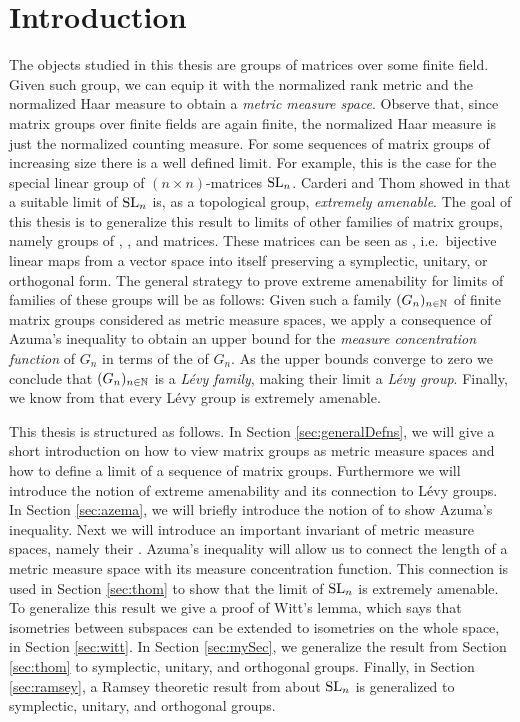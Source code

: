 
\section{Introduction}
The objects studied in this thesis are groups of matrices over some finite field.
Given such group, we can equip it with the normalized rank metric and the normalized Haar measure to obtain a \emph{metric measure space}. Observe that, since matrix groups over finite fields are again finite, the normalized Haar measure is just the normalized counting measure.
For some sequences of matrix groups of increasing size there is a well defined limit. For example, this is the case for the special linear group of $(n\times n)$-matrices $\operatorname{SL}_n$.
Carderi and Thom  showed in \cite{thom} that a suitable limit of $\operatorname{SL}_n$ is, as a topological group, \emph{extremely amenable}. The goal of this thesis is to generalize this result to limits of other families of matrix groups, namely groups of , , and  matrices.  
These matrices can be seen as , i.e.\ bijective linear maps from a vector space into itself preserving a symplectic, unitary, or orthogonal form.
The general strategy to prove extreme amenability for limits of families of these groups will be as follows: Given such a family $(G_n)_{n\in\mathbb{N}}$ of finite matrix groups considered as metric measure spaces, we apply a consequence of Azuma's inequality \cite{azuma1967} to obtain an upper bound for the \emph{measure concentration function} of $G_n$ in terms of the  of $G_n$.
As the upper bounds converge to zero we conclude that $(G_n)_{n\in\mathbb{N}}$ is a \emph{L\'{e}vy family}, making their limit a \emph{L\'{e}vy group}. Finally, we know from \cite{AzemaLevy} that every L\'{e}vy group is extremely amenable.

This thesis is structured as follows. In Section \ref{sec:generalDefns}, we will give a short introduction on how to view matrix groups as metric measure spaces and how to define a limit of a sequence of matrix groups. Furthermore we will introduce the notion of extreme amenability and its connection to L\'evy groups. In Section \ref{sec:azema}, we will briefly introduce the notion of  to show Azuma's inequality. Next we will introduce an important invariant of metric measure spaces, namely their . Azuma's inequality will allow us to connect the length of a metric measure space with its measure concentration function. This connection is used in Section \ref{sec:thom} to show that the limit of $\operatorname{SL}_n$ is extremely amenable. To generalize this result we give a proof of Witt's lemma, which says that isometries between subspaces can be extended to isometries on the whole space, in Section \ref{sec:witt}. In Section \ref{sec:mySec}, we generalize the result from Section \ref{sec:thom} to symplectic, unitary, and orthogonal groups. Finally, in Section \ref{sec:ramsey}, a Ramsey theoretic result from \cite{thom} about $\operatorname{SL}_n$ is generalized to symplectic, unitary, and orthogonal groups.

